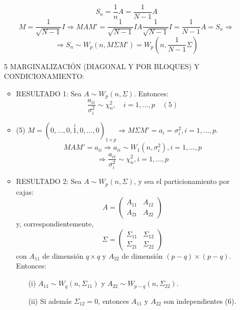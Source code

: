 \documentclass[11pt,a4paper]{article}
\begin{document}
\begin{itemize}
$$S_{n} = \frac{1}{n}A = \frac{1}{N-1}A$$
$$M = \frac{1}{\sqrt{N-1}} I \Rightarrow MAM' = \frac{1}{\sqrt{N-1}} I A \frac{1}{\sqrt{N-1}} I = \frac{1}{N-1}A = S_{n} \Rightarrow$$
$$\Rightarrow S_{n} \sim W_{p}(n, M \Sigma M') = W_{p}(n, \frac{1}{N-1}\Sigma)$$

\item[5] MARGINALIZACIÓN (DIAGONAL Y POR BLOQUES) Y CONDICIONAMIENTO:
\begin{itemize}
\item RESULTADO 1: Sea $A \sim W_{p}(n, \Sigma)$. Entonces:
$$\frac{a_{ii}}{\sigma_{i}^{2}} \sim \chi_{n}^{2}, \quad i=1,\dots,p \quad (5)$$

\item (5) $M = (0, \dots, 0, \overset{i}{1}, 0, \dots, 0)_{1 \times p} \Rightarrow M \Sigma M' = a_{i} = \sigma_{i}^{2}, i = 1, \dots, p$.
$$MAM' = a_{ii} \Rightarrow a_{ii} \sim W_{1}(n, \sigma_{i}^{2}), i = 1, \dots, p$$
$$\Rightarrow \frac{a_{ii}}{\sigma_{i}^{2}} \sim \chi_{n}^{2}, i = 1, \dots, p$$

\item RESULTADO 2: Sea $A \sim W_{p}(n, \Sigma)$, y sea el particionamiento por cajas:
$$A = \begin{pmatrix}
A_{11} & A_{12} \\
A_{21} & A_{22}
\end{pmatrix}$$
y, correspondientemente,
$$\Sigma = \begin{pmatrix}
\Sigma_{11} & \Sigma_{12} \\
\Sigma_{21} & \Sigma_{22}
\end{pmatrix}$$
con $A_{11}$ de dimensión $q \times q$ y $A_{22}$ de dimensión $(p-q)\times(p-q)$. Entonces:
\begin{itemize}
\item[(i)] $A_{11} \sim W_{q}(n, \Sigma_{11})$ y $A_{22} \sim W_{p-q}(n, \Sigma_{22})$.
\item[(ii)] Si además $\Sigma_{12} = 0$, entonces $A_{11}$ y $A_{22}$ son independientes (6).
\end{itemize}


\end{itemize}
\end{itemize}
\end{document}
